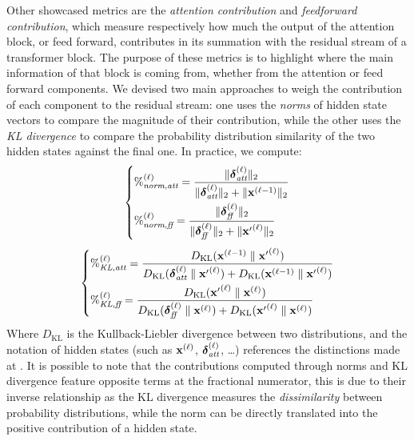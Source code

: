 Other showcased metrics are the \emph{attention contribution} and \emph{feedforward contribution}, which measure respectively how much the output of the attention block, or feed forward, contributes in its summation with the residual stream of a transformer block.
The purpose of these metrics is to highlight where the main information of that block is coming from, whether from the attention or feed forward components.
We devised two main approaches to weigh the contribution of each component to the residual stream: one uses the \emph{norms} of hidden state vectors to compare the magnitude of their contribution, while the other uses the \emph{KL divergence} to compare the probability distribution similarity of the two hidden states against the final one.
In practice, we compute:
\begin{equation}
    \left\{
        \begin{aligned}
            &{\%}^{(\ell)}_{\textit{norm},\textit{att}} = \frac{\|\bm{\mathbf{\delta}}_\textit{att}^{(\ell)}\|_2}{\|\bm{\mathbf{\delta}}_\textit{att}^{(\ell)}\|_2 + \|\bm{\mathbf{x}}^{(\ell-1)}\|_2} \\
            &{\%}^{(\ell)}_{\textit{norm},\textit{ff}} = \frac{\|\bm{\mathbf{\delta}}_\textit{ff}^{(\ell)}\|_2}{\|\bm{\mathbf{\delta}}_\textit{ff}^{(\ell)}\|_2 + \|{\bm{\mathbf{x}}'}^{(\ell)}\|_2} \label{eq:method_intravisto_norm-contrib}
        \end{aligned}
    \right.
\end{equation}
\begin{equation}
    \left\{
        \begin{aligned}
            &{\%}^{(\ell)}_{\textit{KL},\textit{att}} = \frac{D_{\text{KL}}(\bm{\mathbf{x}}^{(\ell-1)} \parallel {\bm{\mathbf{x}}'}^{(\ell)})}{D_{\text{KL}}(\bm{\mathbf{\delta}}_\textit{att}^{(\ell)} \parallel {\bm{\mathbf{x}}'}^{(\ell)}) + D_{\text{KL}}(\bm{\mathbf{x}}^{(\ell-1)} \parallel {\bm{\mathbf{x}}'}^{(\ell)})} \\
            &{\%}^{(\ell)}_{\textit{KL},\textit{ff}} = \frac{D_{\text{KL}}({\bm{\mathbf{x}}'}^{(\ell)} \parallel \bm{\mathbf{x}}^{(\ell)})}{D_{\text{KL}}(\bm{\mathbf{\delta}}_\textit{ff}^{(\ell)} \parallel \bm{\mathbf{x}}^{(\ell)}) + D_{\text{KL}}({\bm{\mathbf{x}}'}^{(\ell)} \parallel \bm{\mathbf{x}}^{(\ell)})} \label{eq:method_intravisto_kl-contrib}
        \end{aligned}
    \right.
\end{equation}
Where $D_{\text{KL}}$ is the Kullback-Liebler divergence between two distributions, and the notation of hidden states (such as $\bm{\mathbf{x}}^{(\ell)}$, $\bm{\mathbf{\delta}}_\textit{att}^{(\ell)}$, \ldots) references the distinctions made at .
It is possible to note that the contributions computed through norms and KL divergence feature opposite terms at the fractional numerator, this is due to their inverse relationship as the KL divergence measures the \emph{dissimilarity} between probability distributions, while the norm can be directly translated into the positive contribution of a hidden state. 

